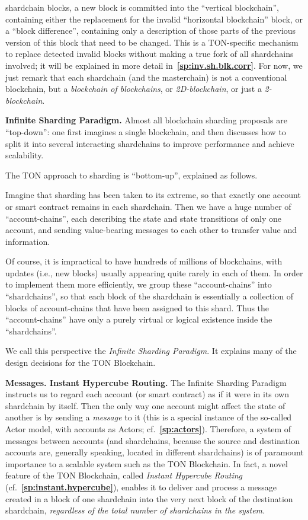 \documentclass[12pt,oneside]{article}
\def\makepoint#1{\medbreak\noindent{\bf #1.\ }}
\def\nxsubpoint{\refstepcounter{subsubsection}%
  \smallbreak\makepoint{\thesubsubsection}}
\def\refpoint#1{{\rm\textbf{\ref{#1}}}}
\let\ptref=\refpoint
\def\embt(#1.){\textbf{#1.}}
\begin{document}
\begin{itemize}
  shardchain blocks, a new block is committed into the ``vertical
  block\-chain'', containing either the replacement for the invalid
  ``horizontal blockchain'' block, or a ``block difference'',
  containing only a description of those parts of the previous version
  of this block that need to be changed. This is a TON-specific
  mechanism to replace detected invalid blocks without making a true
  fork of all shardchains involved; it will be explained in more
  detail in~\ptref{sp:inv.sh.blk.corr}. For now, we just remark that
  each shardchain (and the masterchain) is not a conventional
  blockchain, but a {\em blockchain of blockchains}, or {\em
    2D-blockchain}, or just a {\em 2-blockchain}.
\end{itemize}

\nxsubpoint\label{sp:ISP} \embt(Infinite Sharding Paradigm.)  Almost
all blockchain sharding proposals are ``top-down'': one first imagines
a single blockchain, and then discusses how to split it into several
interacting shardchains to improve performance and achieve
scalability.

The TON approach to sharding is ``bottom-up'', explained as follows.

Imagine that sharding has been taken to its extreme, so that exactly
one account or smart contract remains in each shardchain. Then we have
a huge number of ``account-chains'', each describing the state and
state transitions of only one account, and sending value-bearing
messages to each other to transfer value and information.

Of course, it is impractical to have hundreds of millions of blockchains, with updates (i.e., new blocks) usually appearing quite rarely in each of them. In order to implement them more efficiently, we group these ``account-chains'' into ``shardchains'', so that each block of the shardchain is essentially a collection of blocks of account-chains that have been assigned to this shard. Thus the ``account-chains'' have only a purely virtual or logical existence inside the ``shardchains''.

We call this perspective the {\em Infinite Sharding Paradigm}. It explains many of the design decisions for the TON Blockchain.

\nxsubpoint\label{sp:msg.IHR} \embt(Messages. Instant Hypercube Routing.)
The Infinite Sharding Para\-digm instructs us to regard each account
(or smart contract) as if it were in its own shardchain by
itself. Then the only way one account might affect the state of
another is by sending a {\em message\/} to it (this is a special
instance of the so-called Actor model, with accounts as Actors;
cf.~\ptref{sp:actors}). Therefore, a system of messages between
accounts (and shardchains, because the source and destination accounts
are, generally speaking, located in different shardchains) is of
paramount importance to a scalable system such as the TON
Blockchain. In fact, a novel feature of the TON Blockchain, called
{\em Instant Hypercube Routing\/} (cf.~\ptref{sp:instant.hypercube}),
enables it to deliver and process a message created in a block of one
shardchain into the very next block of the destination shardchain,
{\em regardless of the total number of shardchains in the system.}
\end{document}
